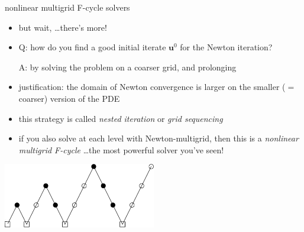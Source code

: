 \documentclass[10pt,
               svgnames,
               hyperref={colorlinks,citecolor=DeepPink4,linkcolor=FireBrick,urlcolor=Maroon},
               usepdftitle=false]{beamer}
\newcommand{\bu}{\mathbf{u}}
\begin{document}
\begin{frame}{nonlinear multigrid F-cycle solvers}
\begin{itemize}
\item but wait, \dots there's more!

\medskip
\item Q: how do you find a good initial iterate $\bu^0$ for the Newton iteration?

\medskip
A: by solving the problem on a coarser grid, and prolonging

\medskip
\item<2-3> justification: the domain of Newton convergence is larger on the smaller ($=$ coarser) version of the PDE

\medskip
\item<3> this strategy is called \emph{nested iteration} or \emph{grid sequencing}
\item<3> if you also solve at each level with Newton-multigrid, then this is a \alert{\emph{nonlinear multigrid F-cycle}} \dots the most powerful solver you've seen!
\end{itemize}

\medskip
\begin{center}
\includegraphics[width=0.5\textwidth]{images/multigrid-fullcycle.png}
\end{center}
\end{frame}
\end{document}
